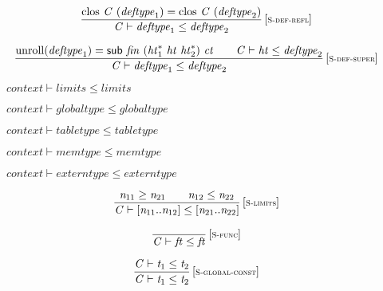 \vspace{1ex}

$$
\begin{array}{@{}c@{}}\displaystyle
\frac{
{\mathrm{clos}}~{\mathit{C}}~({\mathit{deftype}}_{{1}}) = {\mathrm{clos}}~{\mathit{C}}~({\mathit{deftype}}_{{2}})
}{
{\mathit{C}} \vdash {\mathit{deftype}}_{{1}} \leq {\mathit{deftype}}_{{2}}
} \, {[\textsc{\scriptsize S{-}def{-}refl}]}
\qquad
\end{array}
$$

$$
\begin{array}{@{}c@{}}\displaystyle
\frac{
{\mathrm{unroll}}({\mathit{deftype}}_{{1}}) = \mathsf{sub}~{\mathit{fin}}~({{\mathit{ht}}_{{1}}^\ast}~{\mathit{ht}}~{{\mathit{ht}}_{{2}}^\ast})~{\mathit{ct}}
 \qquad
{\mathit{C}} \vdash {\mathit{ht}} \leq {\mathit{deftype}}_{{2}}
}{
{\mathit{C}} \vdash {\mathit{deftype}}_{{1}} \leq {\mathit{deftype}}_{{2}}
} \, {[\textsc{\scriptsize S{-}def{-}super}]}
\qquad
\end{array}
$$

\vspace{1ex}

$\boxed{{\mathit{context}} \vdash {\mathit{limits}} \leq {\mathit{limits}}}$

$\boxed{{\mathit{context}} \vdash {\mathit{globaltype}} \leq {\mathit{globaltype}}}$

$\boxed{{\mathit{context}} \vdash {\mathit{tabletype}} \leq {\mathit{tabletype}}}$

$\boxed{{\mathit{context}} \vdash {\mathit{memtype}} \leq {\mathit{memtype}}}$

$\boxed{{\mathit{context}} \vdash {\mathit{externtype}} \leq {\mathit{externtype}}}$

\vspace{1ex}

$$
\begin{array}{@{}c@{}}\displaystyle
\frac{
{\mathit{n}}_{{11}} \geq {\mathit{n}}_{{21}}
 \qquad
{\mathit{n}}_{{12}} \leq {\mathit{n}}_{{22}}
}{
{\mathit{C}} \vdash {}[{\mathit{n}}_{{11}} .. {\mathit{n}}_{{12}}] \leq {}[{\mathit{n}}_{{21}} .. {\mathit{n}}_{{22}}]
} \, {[\textsc{\scriptsize S{-}limits}]}
\qquad
\end{array}
$$

$$
\begin{array}{@{}c@{}}\displaystyle
\frac{
}{
{\mathit{C}} \vdash {\mathit{ft}} \leq {\mathit{ft}}
} \, {[\textsc{\scriptsize S{-}func}]}
\qquad
\end{array}
$$

$$
\begin{array}{@{}c@{}}\displaystyle
\frac{
{\mathit{C}} \vdash {\mathit{t}}_{{1}} \leq {\mathit{t}}_{{2}}
}{
{\mathit{C}} \vdash {\mathit{t}}_{{1}} \leq {\mathit{t}}_{{2}}
} \, {[\textsc{\scriptsize S{-}global{-}const}]}
\qquad
\end{array}
$$

